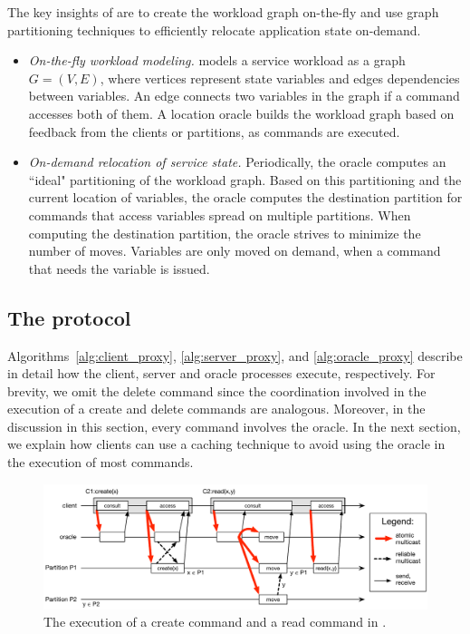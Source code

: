 The key insights of \dynastar are to create the workload graph on-the-fly and use graph partitioning techniques to efficiently relocate application state on-demand.
\begin{itemize}
\item \emph{On-the-fly workload modeling.}
\dynastar models a service workload as a graph $G = (V, E)$, where vertices represent state variables and edges dependencies between variables.
An edge connects two variables in the graph if a command accesses both of them.
A location oracle builds the workload graph based on feedback from the clients or partitions, as commands are executed.
\item \emph{On-demand relocation of service state.}
Periodically, the oracle computes an ``ideal" partitioning of the workload graph.
Based on this partitioning and the current location of variables, the oracle computes the destination partition for commands that access variables spread on multiple partitions.
When computing the destination partition, the oracle strives to minimize the number of moves.
Variables are only moved on demand, when a command that needs the variable is issued.
\end{itemize}




\subsection{The \dynastar protocol}

Algorithms~\ref{alg:client_proxy}, \ref{alg:server_proxy}, and \ref{alg:oracle_proxy} describe in detail how the client, server and oracle processes execute, respectively. 
For brevity, we omit the delete command since the coordination involved in the execution of a create and delete commands are analogous. 
Moreover, in the discussion in this section, every command involves the oracle.
In the next section, we explain how clients can use a caching technique to avoid using the oracle in the execution of most commands.

\begin{figure}
\begin{minipage}[b]{1\linewidth} %
\centering
      \includegraphics[width=0.9\linewidth]{figures/dynastar}
\end{minipage}
\caption{The execution of a create command and a read command in \dynastar.}
\label{fig:oracle_repartition}
\end{figure}

